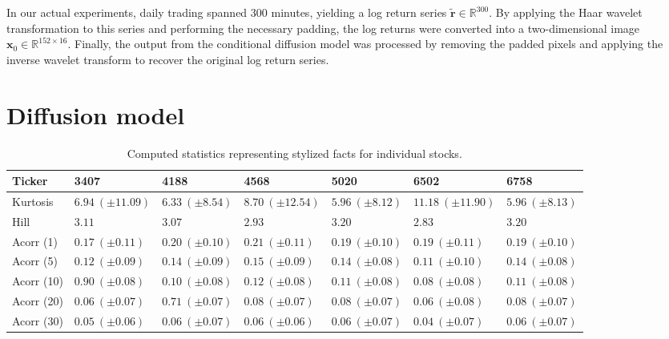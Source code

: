 \documentclass{article}
\begin{document}
In our actual experiments, daily trading spanned 300 minutes, yielding a log return series \(\bm{\tilde{r}} \in \mathbb{R}^{300}\). By applying the Haar wavelet transformation to this series and performing the necessary padding, the log returns were converted into a two-dimensional image \(\bm{x}_0 \in \mathbb{R}^{152 \times 16}\). Finally, the output from the conditional diffusion model was processed by removing the padded pixels and applying the inverse wavelet transform to recover the original log return series.

\section{Diffusion model}

\begin{table}[t]
\centering
\caption{Computed statistics representing stylized facts for individual stocks.}
\begin{tabular}{l|llllll}
\toprule
Ticker & 3407 & 4188 & 4568 & 5020 & 6502 & 6758 \\
\midrule
Kurtosis  & \(6.94~(\pm11.09)\) & \(6.33~(\pm8.54)\) & \(8.70~(\pm12.54)\) & \(5.96~(\pm8.12)\) & \(11.18~(\pm11.90)\) & \(5.96~(\pm8.13)\) \\
Hill      & \(3.11\)           & \(3.07\)           & \(2.93\)           & \(3.20\)           & \(2.83\)           & \(3.20\) \\
Acorr (1) & \(0.17~(\pm0.11)\) & \(0.20~(\pm0.10)\) & \(0.21~(\pm0.11)\) & \(0.19~(\pm0.10)\) & \(0.19~(\pm0.11)\) & \(0.19~(\pm0.10)\) \\
Acorr (5) & \(0.12~(\pm0.09)\) & \(0.14~(\pm0.09)\) & \(0.15~(\pm0.09)\) & \(0.14~(\pm0.08)\) & \(0.11~(\pm0.10)\) & \(0.14~(\pm0.08)\) \\
Acorr (10)& \(0.90~(\pm0.08)\) & \(0.10~(\pm0.08)\) & \(0.12~(\pm0.08)\) & \(0.11~(\pm0.08)\) & \(0.08~(\pm0.08)\) & \(0.11~(\pm0.08)\) \\
Acorr (20)& \(0.06~(\pm0.07)\) & \(0.71~(\pm0.07)\) & \(0.08~(\pm0.07)\) & \(0.08~(\pm0.07)\) & \(0.06~(\pm0.08)\) & \(0.08~(\pm0.07)\) \\
Acorr (30)& \(0.05~(\pm0.06)\) & \(0.06~(\pm0.07)\) & \(0.06~(\pm0.06)\) & \(0.06~(\pm0.07)\) & \(0.04~(\pm0.07)\) & \(0.06~(\pm0.07)\) \\
\bottomrule
\end{tabular}
\vspace{0.1cm}
\centering

\end{table}
\end{document}
